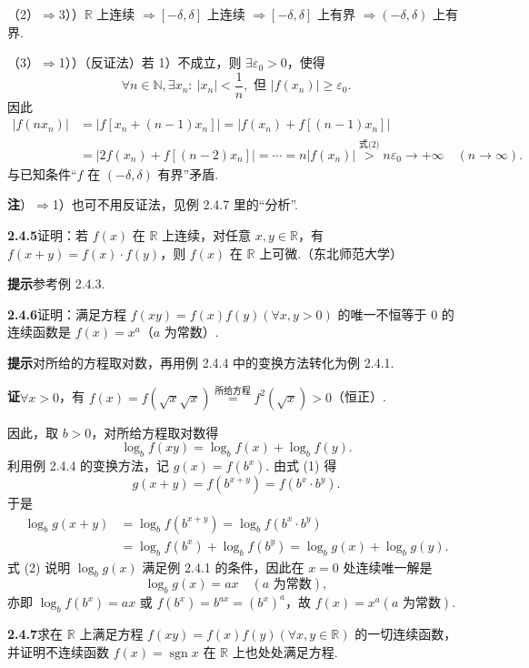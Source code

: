\documentclass[UTF8, 12pt, fontset=fandol, oneside]{ctexart}
\begin{document}
（2）$\Rightarrow$3））$\mathbb{R}$ 上连续 $\Rightarrow[-\delta,\delta]$ 上连续 $\Rightarrow[-\delta,\delta]$ 上有界 $\Rightarrow(-\delta,\delta)$ 上有界.

（3）$\Rightarrow$1））（反证法）若 1）不成立，则 $\exists\varepsilon_0>0$，使得
\[
  \forall n\in\mathbb{N},\exists x_n:\ |x_n|<\frac1n,\text{ 但 }|f(x_n)|\ge\varepsilon_0. \tag{2}
\]
因此
\[
\begin{aligned}
|f(nx_n)|
&=|f[x_n+(n-1)x_n]|=|f(x_n)+f[(n-1)x_n]|\\
&=|2f(x_n)+f[(n-2)x_n]|=\cdots=n|f(x_n)|\overset{\text{式(2)}}{>}n\varepsilon_0\to+\infty\quad(n\to\infty).
\end{aligned}
\]
与已知条件“$f$ 在 $(-\delta,\delta)$ 有界”矛盾.

\noindent\textbf{注}）$\Rightarrow$1）也可不用反证法，见例 2.4.7 里的“分析”.

\noindent\textbf{2.4.5}\quad 证明：若 $f(x)$ 在 $\mathbb{R}$ 上连续，对任意 $x,y\in\mathbb{R}$，有 $f(x+y)=f(x)\cdot f(y)$，则 $f(x)$ 在 $\mathbb{R}$ 上可微.（东北师范大学）

\noindent\textbf{提示}\quad 参考例 2.4.3.

\noindent\textbf{2.4.6}\quad 证明：满足方程 $f(xy)=f(x)f(y)(\forall x,y>0)$ 的唯一不恒等于 0 的连续函数是 $f(x)=x^a$（$a$ 为常数）.

\noindent\textbf{提示}\quad 对所给的方程取对数，再用例 2.4.4 中的变换方法转化为例 2.4.1.

\noindent\textbf{证}\quad $\forall x>0$，有 $f(x)=f(\sqrt{x}\sqrt{x})\overset{\text{所给方程}}{=}f^2(\sqrt{x})>0$（恒正）.

因此，取 $b>0$，对所给方程取对数得
\[
  \log_b f(xy)=\log_b f(x)+\log_b f(y). \tag{1}
\]
利用例 2.4.4 的变换方法，记 $g(x)=f(b^x)$. 由式 (1) 得
\[
  g(x+y)=f(b^{x+y})=f(b^x\cdot b^y).
\]
于是
\[
\begin{aligned}
\log_b g(x+y)
&=\log_b f(b^{x+y})=\log_b f(b^x\cdot b^y)\\
&=\log_b f(b^x)+\log_b f(b^y)=\log_b g(x)+\log_b g(y).
\end{aligned} \tag{2}
\]
式 (2) 说明 $\log_b g(x)$ 满足例 2.4.1 的条件，因此在 $x=0$ 处连续唯一解是
\[
  \log_b g(x)=ax\quad(a\text{ 为常数}),
\]
亦即 $\log_b f(b^x)=ax$ 或 $f(b^x)=b^{ax}=(b^x)^a$，故 $f(x)=x^a(a\text{ 为常数})$.

\noindent\textbf{2.4.7}\quad 求在 $\mathbb{R}$ 上满足方程 $f(xy)=f(x)f(y)(\forall x,y\in\mathbb{R})$ 的一切连续函数，并证明不连续函数 $f(x)=\operatorname{sgn} x$ 在 $\mathbb{R}$ 上也处处满足方程.
\end{document}
